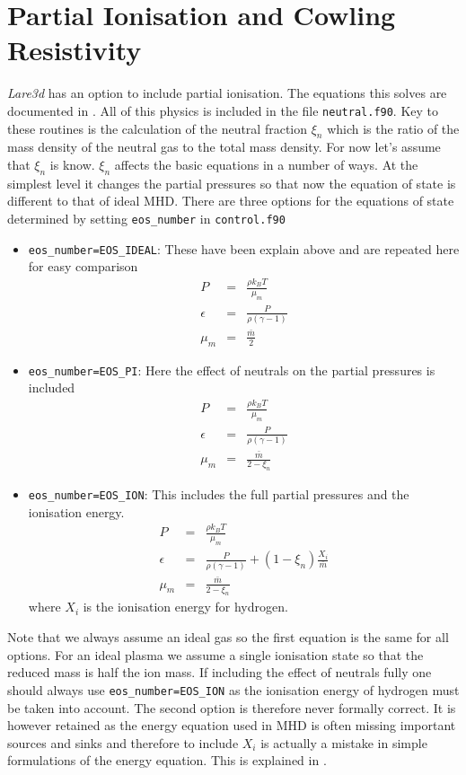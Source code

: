 \documentclass[11pt]{article}
\begin{document}
\section{Partial Ionisation and Cowling Resistivity}
{\it Lare3d} has an option to include partial ionisation. The equations this solves are documented in \cite{flux-emergence}. All of this physics is included in the file \texttt{neutral.f90}. Key to these routines is the calculation of the neutral fraction $\xi_n$ which is the ratio of the mass density of the neutral gas to the total mass density. For now let's assume that $\xi_n$ is know. $\xi_n$ affects the basic equations in a number of ways. At the simplest level it changes the partial pressures so that now the equation of state is different to that of ideal MHD. There are three options for the equations of state determined by setting \texttt{eos\_number} in \texttt{control.f90} 
\begin{itemize}
\item \texttt{eos\_number=EOS\_IDEAL}: These have been explain above and are repeated here for easy comparison
\begin{eqnarray*}
P&=&\frac{\rho k_{B}T}{\mu_m}\\
\epsilon&=&\frac{P}{\rho(\gamma-1)}\\
\mu_m&=&\frac{\bar{m}}{2}
\end{eqnarray*}

\item \texttt{eos\_number=EOS\_PI}: Here the effect of neutrals on the partial pressures is included 
\begin{eqnarray*}
P&=&\frac{\rho k_{B}T}{\mu_m}\\
\epsilon&=&\frac{P}{\rho(\gamma-1)}\\
\mu_m&=&\frac{\bar{m}}{2-\xi_n}
\end{eqnarray*}

\item \texttt{eos\_number=EOS\_ION}: This includes the full partial pressures and the ionisation energy.
\begin{eqnarray*}
P&=&\frac{\rho k_{B}T}{\mu_m}\\
\epsilon&=&\frac{P}{\rho(\gamma-1)}+(1-\xi_n)\frac{X_i}{\bar{m}}\\
\mu_m&=&\frac{\bar{m}}{2-\xi_n}
\end{eqnarray*}
where $X_i$ is the ionisation energy for hydrogen.

\end{itemize}

Note that we always assume an ideal gas so the first equation is the same for all options. For an ideal plasma we assume a single ionisation state so that the reduced mass is half the ion mass. If including the effect of neutrals fully one should always use \texttt{eos\_number=EOS\_ION} as the ionisation energy of hydrogen must be taken into account. The second option is therefore never formally correct. It is however retained as the energy equation used in MHD is often missing important sources and sinks and therefore to include $X_i$ is actually a mistake in simple formulations of the energy equation. This is explained in \cite{flux-emergence}.
\end{document}
